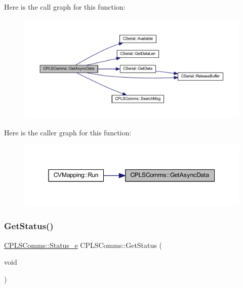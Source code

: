 Here is the call graph for this function\+:\nopagebreak
\begin{figure}[H]
\begin{center}
\leavevmode
\includegraphics[width=350pt]{class_c_p_l_s_comms_a3124eaa4549706962c7024c7c97e82b0_cgraph}
\end{center}
\end{figure}
Here is the caller graph for this function\+:\nopagebreak
\begin{figure}[H]
\begin{center}
\leavevmode
\includegraphics[width=350pt]{class_c_p_l_s_comms_a3124eaa4549706962c7024c7c97e82b0_icgraph}
\end{center}
\end{figure}
\mbox{\label{class_c_p_l_s_comms_a05149da99ab80b804699763111315f33}} 
\subsubsection{\texorpdfstring{GetStatus()}{GetStatus()}}
{\footnotesize\ttfamily \mbox{\hyperlink{class_c_p_l_s_comms_a765bc36363f75f4faf4fd2b41d440159}{C\+P\+L\+S\+Comms\+::\+Status\+\_\+e}} C\+P\+L\+S\+Comms\+::\+Get\+Status (\begin{DoxyParamCaption}\item[{void}]{ }\end{DoxyParamCaption})}



